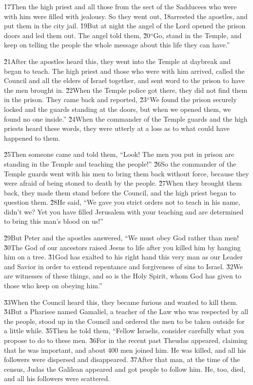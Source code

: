 \v{17}Then the high priest and all those from the sect of the Sadducees who were with him were filled with jealousy. So they went out, \v{18}arrested the apostles, and put them in the city jail. \v{19}But at night the angel of the Lord opened the prison doors and led them out. The angel told them, \v{20}``Go, stand in the Temple, and keep on telling the people the whole message about this life they can have.''

\v{21}After the apostles heard this, they went into the Temple at daybreak and began to teach. The high priest and those who were with him arrived, called the Council and all the elders of Israel together, and sent word to the prison to have the men brought in. \v{22}When the Temple police got there, they did not find them in the prison. They came back and reported, \v{23}``We found the prison securely locked and the guards standing at the doors, but when we opened them, we found no one inside.'' \v{24}When the commander of the Temple guards and the high priests heard these words, they were utterly at a loss as to what could have happened to them.

\v{25}Then someone came and told them, ``Look! The men you put in prison are standing in the Temple and teaching the people!'' \v{26}So the commander of the Temple guards went with his men to bring them back without force, because they were afraid of being stoned to death by the people. \v{27}When they brought them back, they made them stand before the Council, and the high priest began to question them. \v{28}He said, ``We gave you strict orders not to teach in his name, didn't we? Yet you have filled Jerusalem with your teaching and are determined to bring this man's blood on us!''

\v{29}But Peter and the apostles answered, ``We must obey God rather than men! \v{30}The God of our ancestors raised Jesus to life after you killed him by hanging him on a tree. \v{31}God has exalted to his right hand this very man as our Leader and Savior in order to extend repentance and forgiveness of sins to Israel. \v{32}We are witnesses of these things, and so is the Holy Spirit, whom God has given to those who keep on obeying him.''

\v{33}When the Council heard this, they became furious and wanted to kill them. \v{34}But a Pharisee named Gamaliel, a teacher of the Law who was respected by all the people, stood up in the Council and ordered the men to be taken outside for a little while. \v{35}Then he told them, ``Fellow Israelis, consider carefully what you propose to do to these men. \v{36}For in the recent past Theudas appeared, claiming that he was important, and about 400 men joined him. He was killed, and all his followers were dispersed and disappeared. \v{37}After that man, at the time of the census, Judas the Galilean appeared and got people to follow him. He, too, died, and all his followers were scattered.

